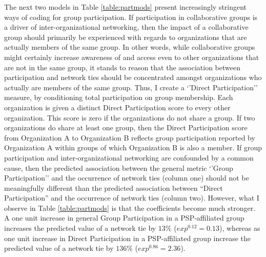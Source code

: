 \documentclass[12pt,a4paper,titlepage]{article}
\begin{document}
%
\singlespacing

\doublespacing

The next two models in Table \ref{table:partmods} present increasingly stringent ways of coding for group participation. If participation in collaborative groups is a driver of inter-organizational networking, then the impact of a collaborative group should primarily be experienced with regards to organizations that are actually members of the same group. In other words, while collaborative groups might certainly increase awareness of and access even to other organizations that are not in the same group, it stands to reason that the association between participation and network ties should be concentrated amongst organizations who actually are members of the same group. Thus, I create a ‘’Direct Participation’’ measure, by conditioning total participation on group membership. Each organization is given a distinct Direct Participation score to every other organization. This score is zero if the organizations do not share a group. If two organizations do share at least one group, then the Direct Participation score from Organization A to Organization B reflects group participation reported by Organization A within groups of which Organization B is also a member. If group participation and inter-organizational networking are confounded by a common cause, then the predicted association between the general metric `'Group Participation'' and the occurrence of network ties (column one) should not be meaningfully different than the predicted association between “Direct Participation” and the occurrence of network ties (column two). However, what I observe in Table \ref{table:partmods} is that the coefficients become much stronger. A one unit increase in general Group Participation in a PSP-affiliated group increases the predicted value of a network tie by $13\%$ ($exp^{0.12} = 0.13$), whereas as one unit increase in Direct Participation in a PSP-affiliated group increase the predicted value of a network tie by $136\%$ ($exp^{0.86} = 2.36$).
\end{document}
